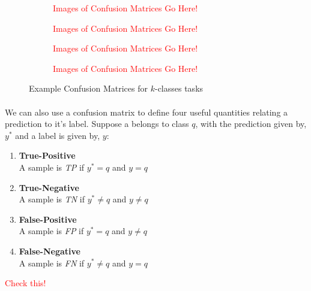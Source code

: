 \documentclass[12pt,letterpaper]{article}
\begin{document}
\begin{figure}[H]
\label{fig-ConfMat}
	\begin{subfigure}[h]{0.45\textwidth}
	\begin{center}
	\textcolor{red}{Images of Confusion Matrices Go Here!} 
	\end{center}
	\end{subfigure}
	\begin{subfigure}[h]{0.45\textwidth}
	\begin{center}
	\textcolor{red}{Images of Confusion Matrices Go Here!} 
	\end{center}
	\end{subfigure}
	\begin{subfigure}[h]{0.45\textwidth}
	\begin{center}
	\textcolor{red}{Images of Confusion Matrices Go Here!} 
	\end{center}
	\end{subfigure}
	\begin{subfigure}[h]{0.45\textwidth}
	\begin{center}
	\textcolor{red}{Images of Confusion Matrices Go Here!} 
	\end{center}
	\end{subfigure}
\caption{Example Confusion Matrices for $k$-classes tasks}
\end{figure}
 
\paragraph*{}We can also use a confusion matrix to define four useful quantities relating a prediction to it's label. Suppose a belongs to class $q$, with the prediction given by, $y^*$ and a label is given by, $y$:
\begin{enumerate}
\item \textbf{True-Positive}\\
A sample is \textit{TP} if $y^* = q$ and $y = q$
\item \textbf{True-Negative}\\
A sample is \textit{TN} if $y^* \neq q$ and $y \neq q$ 
\item \textbf{False-Positive}\\
A sample is \textit{FP} if $y^* = q$ and $y \neq q$ 
\item \textbf{False-Negative}\\
A sample is \textit{FN} if $y^* \neq q$ and $y = q$
\end{enumerate}
\textcolor{red}{Check this!}
\end{document}
